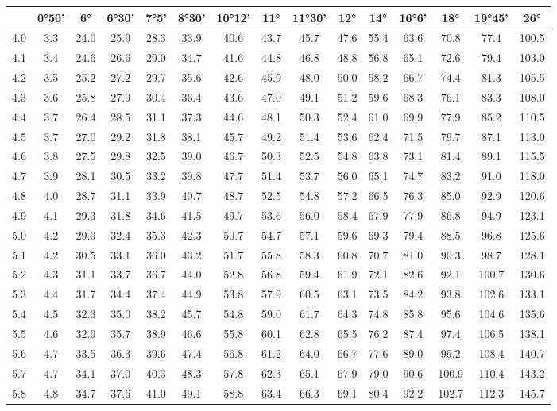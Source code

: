 \begin{footnotesize}\begin{tabular}{c | c | c | c | c | c | c | c | c | c | c | c | c | c | c}
		\space&0°50'&6°&6°30'&7°5'&8°30'&10°12'&11°&11°30'&12°&14°&16°6'&18°&19°45'&26°\\\hline
		4.0&3.3&24.0&25.9&28.3&33.9&40.6&43.7&45.7&47.6&55.4&63.6&70.8&77.4&100.5\\\hline
		4.1&3.4&24.6&26.6&29.0&34.7&41.6&44.8&46.8&48.8&56.8&65.1&72.6&79.4&103.0\\\hline
		4.2&3.5&25.2&27.2&29.7&35.6&42.6&45.9&48.0&50.0&58.2&66.7&74.4&81.3&105.5\\\hline
		4.3&3.6&25.8&27.9&30.4&36.4&43.6&47.0&49.1&51.2&59.6&68.3&76.1&83.3&108.0\\\hline
		4.4&3.7&26.4&28.5&31.1&37.3&44.6&48.1&50.3&52.4&61.0&69.9&77.9&85.2&110.5\\\hline
		4.5&3.7&27.0&29.2&31.8&38.1&45.7&49.2&51.4&53.6&62.4&71.5&79.7&87.1&113.0\\\hline
		4.6&3.8&27.5&29.8&32.5&39.0&46.7&50.3&52.5&54.8&63.8&73.1&81.4&89.1&115.5\\\hline
		4.7&3.9&28.1&30.5&33.2&39.8&47.7&51.4&53.7&56.0&65.1&74.7&83.2&91.0&118.0\\\hline
		4.8&4.0&28.7&31.1&33.9&40.7&48.7&52.5&54.8&57.2&66.5&76.3&85.0&92.9&120.6\\\hline
		4.9&4.1&29.3&31.8&34.6&41.5&49.7&53.6&56.0&58.4&67.9&77.9&86.8&94.9&123.1\\\hline
		5.0&4.2&29.9&32.4&35.3&42.3&50.7&54.7&57.1&59.6&69.3&79.4&88.5&96.8&125.6\\\hline
		5.1&4.2&30.5&33.1&36.0&43.2&51.7&55.8&58.3&60.8&70.7&81.0&90.3&98.7&128.1\\\hline
		5.2&4.3&31.1&33.7&36.7&44.0&52.8&56.8&59.4&61.9&72.1&82.6&92.1&100.7&130.6\\\hline
		5.3&4.4&31.7&34.4&37.4&44.9&53.8&57.9&60.5&63.1&73.5&84.2&93.8&102.6&133.1\\\hline
		5.4&4.5&32.3&35.0&38.2&45.7&54.8&59.0&61.7&64.3&74.8&85.8&95.6&104.6&135.6\\\hline
		5.5&4.6&32.9&35.7&38.9&46.6&55.8&60.1&62.8&65.5&76.2&87.4&97.4&106.5&138.1\\\hline
		5.6&4.7&33.5&36.3&39.6&47.4&56.8&61.2&64.0&66.7&77.6&89.0&99.2&108.4&140.7\\\hline
		5.7&4.7&34.1&37.0&40.3&48.3&57.8&62.3&65.1&67.9&79.0&90.6&100.9&110.4&143.2\\\hline
		5.8&4.8&34.7&37.6&41.0&49.1&58.8&63.4&66.3&69.1&80.4&92.2&102.7&112.3&145.7\\\hline

\end{tabular}
\end{footnotesize}
